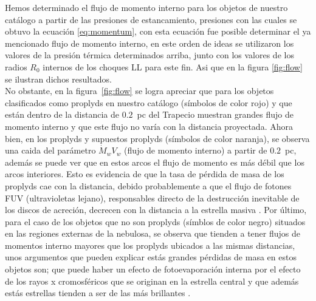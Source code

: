 Hemos determinado el flujo de momento interno para los objetos de nuestro catálogo a partir de las presiones de estancamiento, presiones con las cuales se obtuvo la ecuación \ref{eq:momentum}, con esta ecuación fue posible determinar el ya mencionado flujo de momento interno, en este orden de ideas se utilizaron los valores de la presión térmica determinados arriba, junto con los valores de los radios \(R_{0}\) internos de los choques LL para este fin. Asi que en la figura \ref{fig:flow} se ilustran dichos resultados.\\

No obstante, en la figura~\ref{fig:flow} se logra apreciar que para los objetos clasificados como proplyds en nuestro catálogo (símbolos de color rojo) y que están dentro de la distancia de \(0.2\)~pc del Trapecio muestran grandes flujo de momento interno y que este flujo no varía con la distancia proyectada. Ahora bien, en los proplyds y supuestos proplyds (símbolos de color naranja), se observa una caida del parámetro \(\dot{M}_{w}V_{w}\) (flujo de momento interno) a partir de \(0.2\)~pc, además se puede ver que en estos arcos el flujo de momento es más débil que los arcos interiores. Esto es evidencia de que la tasa de pérdida de masa de los proplyds cae con la distancia, debido probablemente  a que el flujo de fotones FUV (ultravioletas lejano), responsables directo de la destrucción inevitable de los discos de acreción, decrecen con la distancia a la estrella masiva \thC{}. Por último, para el caso de los objetos que no son proplyds (símblos de color negro) situados en las regiones externas de la nebulosa, se observa que tienden a tener  flujos de momentos interno mayores que los proplyds ubicados a las mismas distancias, unos argumentos que pueden explicar estás grandes pérdidas de masa en estos objetos son; que puede haber un efecto de fotoevaporación interna por el efecto de los rayos x cromosféricos que se originan en la estrella central y que además estás estrellas tienden a ser de las más brillantes \citep{Clarke:2014}.\\ 


%

%
